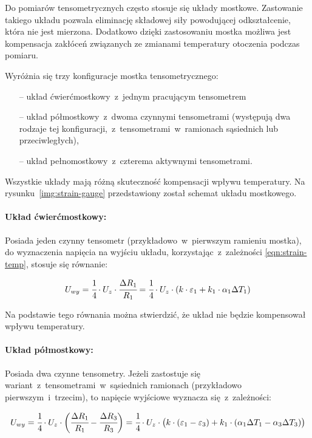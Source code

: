 Do pomiarów tensometrycznych często stosuje się układy mostkowe. Zastowanie takiego układu pozwala
eliminację składowej siły powodującej odkształcenie, która nie jest mierzona. Dodatkowo dzięki
zastosowaniu mostka możliwa jest kompensacja zakłóceń związanych ze zmianami temperatury otoczenia
podczas pomiaru.

Wyróżnia się trzy konfiguracje mostka tensometrycznego:
\begin{itemize}
  \item [--] układ ćwierćmostkowy~z~jednym pracującym tensometrem
  \item [--] układ półmostkowy~z~dwoma czynnymi tensometrami (występują dwa rodzaje tej
        konfiguracji,~z~tensometrami~w~ramionach sąsiednich lub przeciwległych),
  \item [--] układ pełnomostkowy~z~czterema aktywnymi tensometrami.
\end{itemize}
Wszystkie układy mają różną skuteczność kompensacji wpływu temperatury. Na
rysunku~\ref{img:strain-gauge} przedstawiony został schemat układu mostkowego.


\paragraph{Układ ćwierćmostkowy:} Posiada jeden czynny tensometr (przykładowo~w~pierwszym ramieniu
mostka), do wyznaczenia napięcia na wyjściu układu, korzystając~z~zależności \ref{eqn:strain-temp},
stosuje się równanie:

\begin{equation}\label{eqn:quater-bridge}
  U_{wy}=\cfrac{1}{4}\cdot{U_z}\cdot\cfrac{\Delta R_1}{R_1}=\cfrac{1}{4}\cdot{U_z}\cdot({k}
  \cdot\varepsilon_1+{k_1}\cdot\alpha_1\Delta{T_1})
\end{equation}

Na podstawie tego równania można stwierdzić, że układ nie będzie kompensował wpływu temperatury.

\paragraph{Układ półmostkowy:} Posiada dwa czynne tensometry. Jeżeli zastostuje się
wariant~z~tensometrami~w~sąsiednich ramionach (przykładowo pierwszym~i~trzecim), to napięcie
wyjściowe wyznacza się~z~zależności:

\begin{equation}\label{eqn:half-bridge-adj}
  U_{wy}=\cfrac{1}{4}\cdot{U_z}\cdot\bigg(\cfrac{\Delta R_1}{R_1}-\cfrac{\Delta R_3}{R_3}\bigg)=
  \cfrac{1}{4}\cdot{U_z}\cdot\big({k}\cdot(\varepsilon_1-\varepsilon_3)+{k_1}\cdot(\alpha_1
  \Delta{T_1}-\alpha_3\Delta{T_3})\big)
\end{equation}

